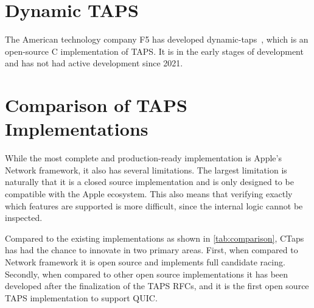 \section{Dynamic TAPS}
The American technology company F5 has developed dynamic-taps~\cite{dukeDynamictaps2025}, which is an
open-source C implementation of TAPS. It
is in the early stages of development and has not had
active development since 2021.

\section{Comparison of TAPS Implementations}\label{sec:tapsfeatures}
While the most complete and production-ready implementation is Apple's Network framework, it
also has several limitations. The largest limitation is naturally that it is a closed source
implementation and is only designed to be compatible with the Apple ecosystem.
This also means that verifying exactly which features are supported
is more difficult, since the internal logic cannot be inspected.

Compared to the existing implementations as shown in \cref{tab:comparison}, CTaps has
had the chance to innovate in two primary areas. First, when compared to Network framework it is open
source and implements full candidate racing. Secondly, when compared to other open source
implementations it has been developed after the finalization of the TAPS RFCs, and it is the
first open source TAPS implementation to support QUIC. 

